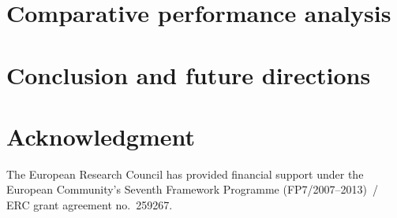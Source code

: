 \documentclass[conference]{IEEEtran}
\begin{document}
\section{Comparative performance analysis}
\label{sec:comparison}



\section{Conclusion and future directions}
\label{sec:ccl}








\section*{Acknowledgment}

The European Research Council has provided financial support
under the European Community's Seventh Framework Programme (FP7/2007--2013)~/
ERC grant agreement no.~259267.




\end{document}
